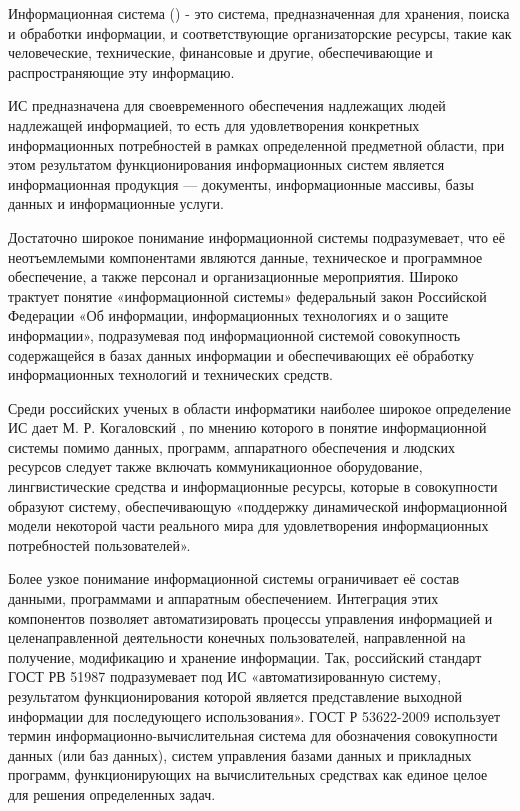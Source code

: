 Информационная система () - это система, предназначенная для хранения, поиска и обработки информации, и соответствующие организаторские ресурсы, такие как человеческие, технические, финансовые и другие, обеспечивающие и распространяющие эту информацию.

ИС предназначена для своевременного обеспечения надлежащих людей надлежащей информацией, то есть для удовлетворения конкретных информационных потребностей в рамках определенной предметной области, при этом результатом функционирования информационных систем является информационная продукция — документы, информационные массивы, базы данных и информационные услуги.

Достаточно широкое понимание информационной системы подразумевает, что её неотъемлемыми компонентами являются данные, техническое и программное обеспечение, а также персонал и организационные мероприятия. Широко трактует понятие «информационной системы» федеральный закон Российской Федерации «Об информации, информационных технологиях и о защите информации», подразумевая под информационной системой совокупность содержащейся в базах данных информации и обеспечивающих её обработку информационных технологий и технических средств.

Среди российских ученых в области информатики наиболее широкое определение ИС дает М. Р. Когаловский \cite{Kogalovskij2013}, по мнению которого в понятие информационной системы помимо данных, программ, аппаратного обеспечения и людских ресурсов следует также включать коммуникационное оборудование, лингвистические средства и информационные ресурсы, которые в совокупности образуют систему, обеспечивающую «поддержку динамической информационной модели некоторой части реального мира для удовлетворения информационных потребностей пользователей».

Более узкое понимание информационной системы ограничивает её состав данными, программами и аппаратным обеспечением. Интеграция этих компонентов позволяет автоматизировать процессы управления информацией и целенаправленной деятельности конечных пользователей, направленной на получение, модификацию и хранение информации. Так, российский стандарт ГОСТ РВ 51987 подразумевает под ИС «автоматизированную систему, результатом функционирования которой является представление выходной информации для последующего использования». ГОСТ Р 53622-2009 использует термин информационно-вычислительная система для обозначения совокупности данных (или баз данных), систем управления базами данных и прикладных программ, функционирующих на вычислительных средствах как единое целое для решения определенных задач.

